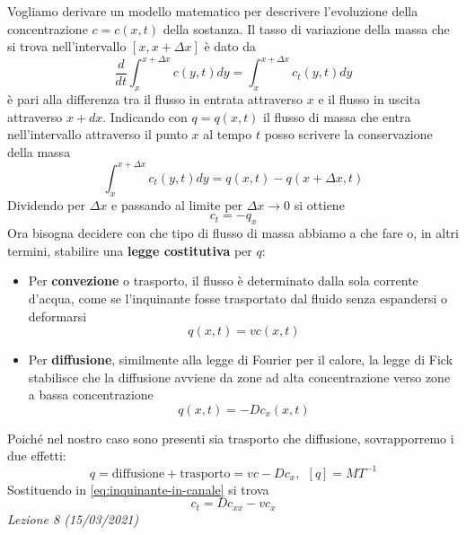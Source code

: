 \documentclass[10pt,a4paper,twoside,openright]{book}
\begin{document}
Vogliamo derivare un modello matematico per descrivere l'evoluzione della concentrazione $\displaystyle c=c(x,t)$ della sostanza. Il tasso di variazione della massa che si trova nell'intervallo $\displaystyle [ x,x+\Delta x]$ è dato da
\begin{equation*}
\frac{d}{dt}\int ^{x+\Delta x}_{x} c(y,t) dy=\int ^{x+\Delta x}_{x} c_{t}(y,t) dy
\end{equation*}
è pari alla differenza tra il flusso in entrata attraverso $\displaystyle x$ e il flusso in uscita attraverso $\displaystyle x+dx$. Indicando con $\displaystyle q=q(x,t)$ il flusso di massa che entra nell'intervallo attraverso il punto $\displaystyle x$ al tempo $\displaystyle t$ posso scrivere la conservazione della massa
\begin{equation*}
\int ^{x+\Delta x}_{x} c_{t}(y,t) dy=q(x,t) -q(x+\Delta x,t)
\end{equation*}
Dividendo per $\displaystyle \Delta x$ e passando al limite per $\displaystyle \Delta x\rightarrow 0$ si ottiene
\begin{equation}
c_{t} =-q_{x}
\label{eq:inquinante-in-canale}
\end{equation}
Ora bisogna decidere con che tipo di flusso di massa abbiamo a che fare o, in altri termini, stabilire una \textbf{legge costitutiva }per $\displaystyle q$:
\begin{itemize}
\item Per \textbf{convezione} o trasporto, il flusso è determinato dalla sola corrente d'acqua, come se l'inquinante fosse trasportato dal fluido senza espandersi o deformarsi\begin{equation*}
q(x,t) =vc(x,t)
\end{equation*}
\item Per \textbf{diffusione}, similmente alla legge di Fourier per il calore, la legge di Fick stabilisce che la diffusione avviene da zone ad alta concentrazione verso zone a bassa concentrazione\begin{equation*}
q(x,t) =-Dc_{x}(x,t)
\end{equation*}
\end{itemize}

Poiché nel nostro caso sono presenti sia trasporto che diffusione, sovrapporremo i due effetti:
\begin{equation*}
q=\text{diffusione} +\text{trasporto} =vc-Dc_{x},\ \ [ q] =MT^{-1}
\end{equation*}
Sostituendo in \eqref{eq:inquinante-in-canale} si trova
\begin{equation*}
\boxed{c_{t} =Dc_{xx} -vc_{x}}
\end{equation*}
\textit{Lezione 8 (15/03/2021)}
\end{document}
